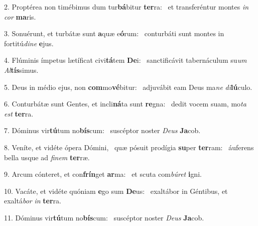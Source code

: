2. Proptérea non timébimus dum tur\textbf{bá}bitur \textbf{ter}ra: \ast\  et transferéntur montes \textit{in} \textit{cor} \textbf{ma}ris.\

3. Sonuérunt, et turbátæ sunt \textbf{a}quæ e\textbf{ó}rum: \ast\  conturbáti sunt montes in fortitú\textit{di}\textit{ne} \textbf{e}jus.\

4. Flúminis ímpetus lætíficat civi\textbf{tá}tem \textbf{De}i: \ast\  sanctificávit tabernáculum su\textit{um} \textit{Al}\textbf{tís}simus.\

5. Deus in médio ejus, non \textbf{com}mo\textbf{vé}bitur: \ast\  adjuvábit eam Deus ma\textit{ne} \textit{di}\textbf{lú}culo.\

6. Conturbátæ sunt Gentes, et incli\textbf{ná}ta sunt \textbf{re}gna: \ast\  dedit vocem suam, mo\textit{ta} \textit{est} \textbf{ter}ra.\

7. Dóminus vir\textbf{tú}tum no\textbf{bís}cum: \ast\  suscéptor noster \textit{De}\textit{us} \textbf{Ja}cob.\

8. Veníte, et vidéte ópera Dómini, \dag\  quæ pósuit prodígia \textbf{su}per \textbf{ter}ram: \ast\  áuferens bella usque ad \textit{fi}\textit{nem} \textbf{ter}ræ.\

9. Arcum cónteret, et con\textbf{frín}get \textbf{ar}ma: \ast\  et scuta com\textit{bú}\textit{ret} \textbf{i}gni.\

10. Vacáte, et vidéte quóniam \textbf{e}go sum \textbf{De}us: \ast\  exaltábor in Géntibus, et exaltá\textit{bor} \textit{in} \textbf{ter}ra.\

11. Dóminus vir\textbf{tú}tum no\textbf{bís}cum: \ast\  suscéptor noster \textit{De}\textit{us} \textbf{Ja}cob.\

